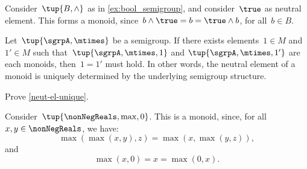 \begin{example}
  \label{ex:bool_monoid}
  Consider~$\tup{B,\wedge}$ as in \cref{ex:bool_semigroup}, and consider~$\true$ as neutral element. This forms a monoid, since~$b\wedge \true=b=\true \wedge b$, for all~$b\in B$.
\end{example}

\begin{lemma}
  \label{neut-el-unique}
  Let~$\tup{\sgrpA, \mtimes}$ be a semigroup. If there exists elements~$1 \in M$ and~$1' \in M$ such that~$\tup{\sgrpA, \mtimes, 1}$ and $\tup{\sgrpA, \mtimes, 1'}$ are each monoids, then~$1 = 1'$ must hold.
  In other words, the neutral element of a monoid is uniquely determined by the underlying semigroup structure.
\end{lemma}

\begin{gradedexercise}
  Prove \cref{neut-el-unique}.
\end{gradedexercise}
\begin{solution}
\end{solution}



\begin{example}
  Consider~$\tup{\nonNegReals,\max,0}$. This is a monoid, since, for all~$x,y\in \nonNegReals$, we have:
  \begin{equation*}
    \max(\max(x,y),z)=\max(x,\max(y,z)),
  \end{equation*}
  and
  \begin{equation*}
    \max(x,0)=x=\max(0,x).
  \end{equation*}
\end{example}




